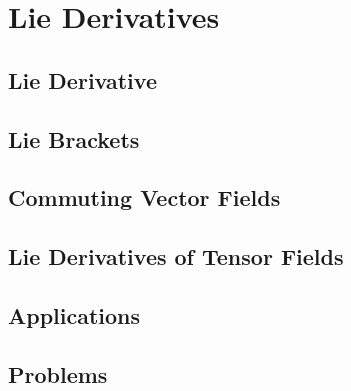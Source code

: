 \chapter{Lie Derivatives}
\section{Lie Derivative}
\section{Lie Brackets}
\section{Commuting Vector Fields}
\section{Lie Derivatives of Tensor Fields}
\section{Applications}
\section{Problems}